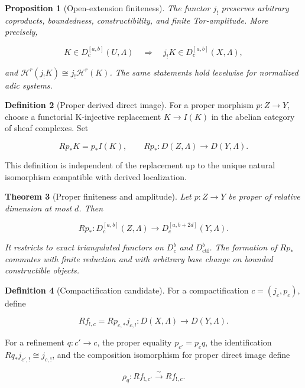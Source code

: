\documentclass[10pt]{article}
\newtheorem{theorem}{Theorem}[section]
\newtheorem{proposition}[theorem]{Proposition}
\theoremstyle{definition}
\newtheorem{definition}[theorem]{Definition}
\newcommand{\Dbc}{D^b_c}
\newcommand{\Dctf}{D^b_{\mathrm{ctf}}}
\begin{document}
\begin{proposition}[Open-extension finiteness]
The functor \(j_!\) preserves arbitrary coproducts, boundedness,
constructibility, and finite Tor-amplitude.  More precisely,

\[
 K\in D^{[a,b]}_c(U,\Lambda)
 \quad\Longrightarrow\quad
 j_!K\in D^{[a,b]}_c(X,\Lambda),
\]

and \(\mathcal H^r(j_!K)\cong j_!\mathcal H^r(K)\).
The same statements hold levelwise for normalized adic systems.
\end{proposition}

\begin{definition}[Proper derived direct image]
For a proper morphism \(p:Z\to Y\), choose a functorial K-injective
replacement \(K\to I(K)\) in the abelian category of sheaf complexes.  Set

\[
 Rp_*K=p_*I(K),
 \qquad Rp_*:D(Z,\Lambda)\longrightarrow D(Y,\Lambda).
\]

This definition is independent of the replacement up to the unique natural
isomorphism compatible with derived localization.
\end{definition}

\begin{theorem}[Proper finiteness and amplitude]
Let \(p:Z\to Y\) be proper of relative dimension at most \(d\).  Then

\[
 Rp_*:D^{[a,b]}_c(Z,\Lambda)\longrightarrow
 D^{[a,b+2d]}_c(Y,\Lambda).
\]

It restricts to exact triangulated functors on \(\Dbc\) and \(\Dctf\).
The formation of \(Rp_*\) commutes with finite reduction and with arbitrary
base change on bounded constructible objects.
\end{theorem}

\begin{definition}[Compactification candidate]
For a compactification \(c=(j_c,p_c)\), define

\[
 Rf_{!,c}=Rp_{c,*}j_{c,!}:D(X,\Lambda)\longrightarrow D(Y,\Lambda).
\]

For a refinement \(q:c'\to c\), the proper equality
\(p_{c'}=p_cq\), the identification
\(Rq_*j_{c',!}\cong j_{c,!}\), and the composition isomorphism for proper
direct image define

\[
 \rho_{q}:Rf_{!,c'}\xrightarrow{\sim}Rf_{!,c}.
\]
\end{definition}
\end{document}
